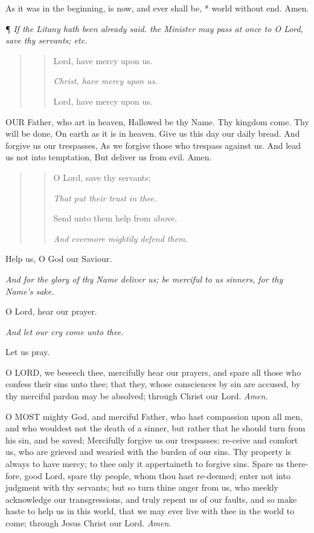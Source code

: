 As it was in the beginning, is now, and ever shall
be, * world without end. Amen.

¶ \emph{If the Litany
hath been already said. the Minister may pass at once to O Lord, save
thy servants; etc.}

\begin{quote}

\begin{quote}

Lord, have mercy
upon us.

\emph{Christ, have mercy upon us.}

Lord, have mercy upon us.

\end{quote}

\end{quote}

OUR
Father, who art in heaven, Hallowed be thy Name. Thy kingdom come. Thy
will be done, On earth as it is in heaven. Give us this day our daily
bread. And forgive us our trespasses, As we forgive those who trespass
against us. And lead us not into temptation, But deliver us from evil.
Amen.

\begin{quote}

\begin{quote}

O Lord, save thy servants; 

\emph{That put their trust in thee.}

Send unto them help from above. 

\emph{And evermore mightily defend them.}

\end{quote}

\end{quote}

Help us, O God our Saviour. 

\emph{And for the glory of thy Name deliver us; be
merciful to us sinners, for thy Name's sake.}

O Lord, hear our prayer. 

\emph{And let our cry come unto thee.}

Let us pray.

O LORD, we beseech thee,
mercifully hear our prayers, and spare all those who confess their sins
unto thee; that they, whose consciences by sin are accused, by thy merciful
pardon may be absolved; through Christ our Lord. \emph{Amen}.

O MOST mighty God, and
merciful Father, who hast compassion upon all men, and who wouldest not
the death of a sinner, but rather that he should turn from his sin, and
be saved; Mercifully forgive us our trespasses; re-ceive and comfort us,
who are grieved and wearied with the burden of our sins. Thy property
is always to have mercy; to thee only it appertaineth to forgive sins.
Spare us there-fore, good Lord, spare thy people, whom thou hast re-deemed;
enter not into judgment with thy servants; but so turn thine anger from
us, who meekly acknowledge our transgressions, and truly repent us of
our faults, and so make haste to help us in this world, that we may ever
live with thee in the world to come; through Jesus Christ our Lord. \emph{Amen}.

